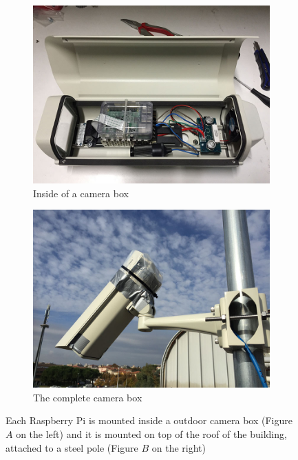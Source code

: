 \begin{figure}
	\centering
    \begin{subfigure}{0.48\columnwidth}
		\includegraphics[width=\columnwidth]{camera_inside}
        \caption{Inside of a camera box}
	\end{subfigure} %
    \begin{subfigure}{0.48\columnwidth}
		\includegraphics[width=\columnwidth]{camera_box}
        \caption{The complete camera box}
	\end{subfigure}

	\caption{Each Raspberry Pi is mounted inside a outdoor camera box (Figure $A$ on the left) and it is mounted on top of the roof of the building, attached to a steel pole (Figure $B$ on the right)}
	\label{fig:mini:camera-box}
\end{figure}

